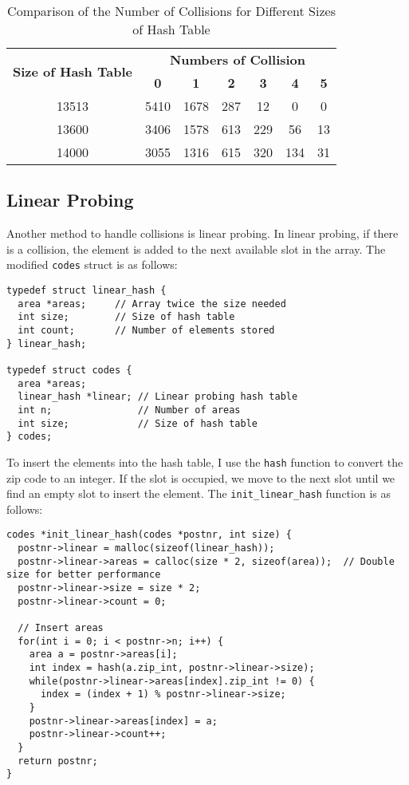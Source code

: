 \documentclass[a4paper,11pt]{article}
\begin{document}
\begin{table}[h!]
  \centering
  \begin{tabular}{|c|c|c|c|c|c|c|}
    \hline
    \multirow{2}{*}{\textbf{Size of Hash Table}} & \multicolumn{6}{c|}{\textbf{Numbers of Collision}} \\ 
    \cline{2-7} & \textbf{0} & \textbf{1} & \textbf{2} & \textbf{3} & \textbf{4} & \textbf{5} \\ \hline
    13513 & 5410 & 1678 & 287 & 12 & 0 & 0 \\ \hline
    13600 & 3406 & 1578 & 613 & 229 & 56 & 13 \\ \hline
    14000 & 3055 & 1316 & 615 & 320 & 134 & 31 \\ \hline
  \end{tabular}
  \caption{Comparison of the Number of Collisions for Different Sizes of Hash Table}
  \label{table:collisions}
\end{table}

\subsection*{Linear Probing}

Another method to handle collisions is linear probing. In linear probing, if there is a collision,
the element is added to the next available slot in the array.
The modified {\tt codes} struct is as follows:

\begin{verbatim}
typedef struct linear_hash {
  area *areas;     // Array twice the size needed
  int size;        // Size of hash table
  int count;       // Number of elements stored
} linear_hash;

typedef struct codes {
  area *areas;
  linear_hash *linear; // Linear probing hash table
  int n;               // Number of areas
  int size;            // Size of hash table
} codes;
\end{verbatim}

To insert the elements into the hash table, I use the {\tt hash} function to convert the zip code to an integer.
If the slot is occupied, we move to the next slot until we find an empty slot to insert the element.
The {\tt init\_linear\_hash} function is as follows:

\begin{verbatim}
codes *init_linear_hash(codes *postnr, int size) {
  postnr->linear = malloc(sizeof(linear_hash));
  postnr->linear->areas = calloc(size * 2, sizeof(area));  // Double size for better performance
  postnr->linear->size = size * 2;
  postnr->linear->count = 0;

  // Insert areas
  for(int i = 0; i < postnr->n; i++) {
    area a = postnr->areas[i];
    int index = hash(a.zip_int, postnr->linear->size);
    while(postnr->linear->areas[index].zip_int != 0) {
      index = (index + 1) % postnr->linear->size;
    }
    postnr->linear->areas[index] = a;
    postnr->linear->count++;
  }
  return postnr;
}
\end{verbatim}
\end{document}
